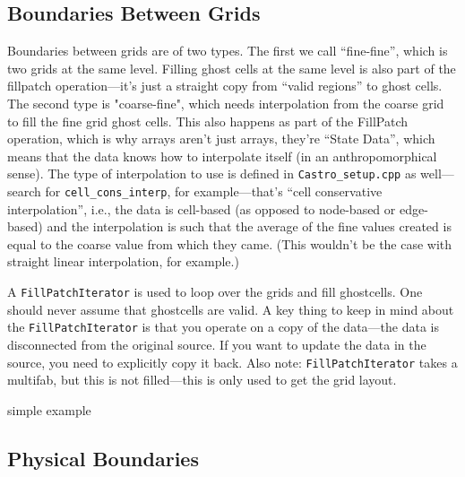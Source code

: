 \subsection{Boundaries Between Grids}
Boundaries between grids are of two types. The first we call
``fine-fine'', which is two grids at the same level.  Filling ghost
cells at the same level is also part of the fillpatch operation---it's
just a straight copy from ``valid regions'' to ghost cells. The second
type is "coarse-fine", which needs interpolation from the coarse grid
to fill the fine grid ghost cells.  This also happens as part of the
FillPatch operation, which is why arrays aren't just arrays, they're
``State Data'', which means that the data knows how to interpolate
itself (in an anthropomorphical sense).  The type of interpolation to
use is defined in {\tt Castro\_setup.cpp} as well---search for
{\tt cell\_cons\_interp}, for example---that's ``cell conservative
interpolation'', i.e., the data is cell-based (as opposed to node-based
or edge-based) and the interpolation is such that the average of the
fine values created is equal to the coarse value from which they came.
(This wouldn't be the case with straight linear interpolation, for
example.)

A {\tt FillPatchIterator} is used to loop over the grids and fill
ghostcells.  One should never assume that ghostcells are valid.  A key
thing to keep in mind about the {\tt FillPatchIterator} is that you
operate on a copy of the data---the data is disconnected from the
original source.  If you want to update the data in the source,
you need to explicitly copy it back.  Also note: {\tt FillPatchIterator}
takes a multifab, but this is not filled---this is only used to
get the grid layout.   

{\color{red}simple example}


\subsection{Physical Boundaries}

